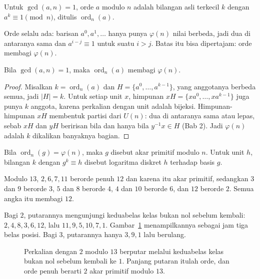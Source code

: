 \begin{definisi}
Untuk $\gcd(a,n)=1$, orde $a$ modulo $n$ adalah bilangan asli terkecil $k$ dengan
$a^k\equiv1\pmod n$, ditulis $\operatorname{ord}_n(a)$.
\end{definisi}

Orde selalu ada: barisan $a^0,a^1,\dots$ hanya punya $\varphi(n)$ nilai berbeda, jadi dua di
antaranya sama dan $a^{i-j}\equiv1$ untuk suatu $i>j$. Batas itu bisa dipertajam: orde membagi
$\varphi(n)$.

\begin{lemma}
Bila $\gcd(a,n)=1$, maka $\operatorname{ord}_n(a)$ membagi $\varphi(n)$.
\end{lemma}

\begin{proof}
Misalkan $k=\operatorname{ord}_n(a)$ dan $H=\{a^0,\dots,a^{k-1}\}$, yang anggotanya berbeda
semua, jadi $|H|=k$. Untuk setiap unit $x$, himpunan $xH=\{xa^0,\dots,xa^{k-1}\}$ juga punya
$k$ anggota, karena perkalian dengan unit adalah bijeksi. Himpunan-himpunan $xH$ membentuk
partisi dari $U(n)$: dua di antaranya sama atau lepas, sebab $xH$ dan $yH$ beririsan bila dan
hanya bila $y^{-1}x\in H$ (Bab 2). Jadi $\varphi(n)$ adalah $k$ dikalikan banyaknya bagian.
\end{proof}

\begin{definisi}
Bila $\operatorname{ord}_n(g)=\varphi(n)$, maka $g$ disebut akar primitif modulo $n$. Untuk
unit $h$, bilangan $k$ dengan $g^k\equiv h$ disebut logaritma diskret $h$ terhadap basis $g$.
\end{definisi}

Modulo $13$, $2,6,7,11$ berorde penuh $12$ dan karena itu akar primitif, sedangkan $3$ dan $9$
berorde $3$, $5$ dan $8$ berorde $4$, $4$ dan $10$ berorde $6$, dan $12$ berorde $2$. Semua
angka itu membagi $12$.

Bagi $2$, putarannya mengunjungi keduabelas kelas bukan nol sebelum kembali:
$2,4,8,3,6,12$, lalu $11,9,5,10,7,1$. Gambar~\ref{fig:jam} menampilkannya sebagai jam tiga
belas posisi. Bagi $3$, putarannya hanya $3,9,1$ lalu berulang.

\begin{figure}[htbp]
\centering
{}
\caption{Perkalian dengan $2$ modulo $13$ berputar melalui keduabelas kelas bukan nol
sebelum kembali ke $1$. Panjang putaran itulah orde, dan orde penuh berarti $2$ akar
primitif modulo $13$.}
\label{fig:jam}
\end{figure}

